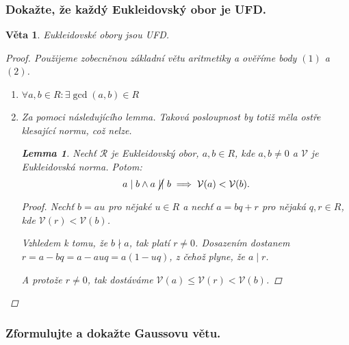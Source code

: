 \documentclass[10pt,a4paper]{article}
\newtheorem{veta}{Věta}
\newtheorem{lemma}{Lemma}
\newcommand{\V}{{\mathcal{V}}}      %
\newcommand{\RR}{{\mathcal{R}}}     %
\begin{document}
\newpage
\subsubsection{Dokažte, že každý Eukleidovský obor je UFD.}

\begin{veta}
    Eukleidovské obory jsou UFD.
    \begin{proof} Použijeme zobecněnou základní větu aritmetiky a ověříme body $(1)$ a $(2)$.
        \begin{enumerate}[label=(\arabic*)]
            \item $\forall a,b \in R: \exists \gcd(a,b) \in R$
            \item Za pomoci následujícího lemma. Taková posloupnost by totiž měla ostře klesající normu, což nelze.
            \begin{lemma}
                Nechť $\RR$ je Eukleidovský obor, $a,b\in R$, kde $a,b\neq 0$ a $\V$ je Eukleidovská norma. Potom: $$a\mid b \land a ~\cancel{\mid\mid}~b \implies \V(a) < \V(b).$$
                \begin{proof}
                    Nechť $b = au$ pro nějaké $u\in R$ a nechť $a = bq + r$ pro nějaká $q,r \in R$, kde $\V(r) < \V(b)$.

                    Vzhledem k tomu, že $b \nmid a$, tak platí $r\neq 0$. Dosazením dostanem $r = a - bq = a - auq = a(1-uq)$, z čehož plyne, že $a \mid r$.

                    A protože $r \neq 0$, tak dostáváme $\V(a) \leq \V(r) < \V(b)$.
                \end{proof}
            \end{lemma}
        \end{enumerate}
    \end{proof}
\end{veta}

\subsubsection{Zformulujte a dokažte Gaussovu větu.}
\end{document}
